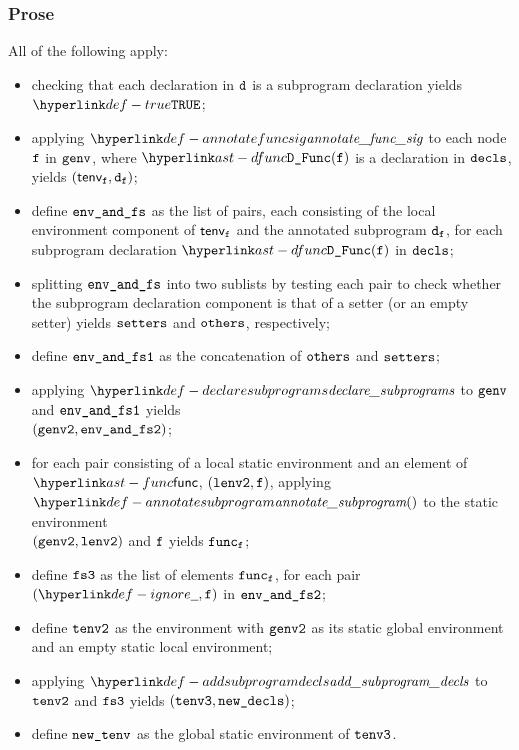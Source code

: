 \subsubsection{Prose}
All of the following apply:
\begin{itemize}
  \item checking that each declaration in $\texttt{d}$ is a subprogram declaration yields $\True$\ProseOrTypeError;
  \item applying $\annotatefuncsig$ to each node $\texttt{f}$ in $\texttt{genv}$, where $\DFunc(\vf)$ is a declaration in $\texttt{decls}$,
        yields $(\textsf{tenv}_{\texttt{f}}, \texttt{d}_{\texttt{f}})$\ProseOrTypeError;
  \item define $\texttt{env\_and\_fs}$ as the list of pairs, each consisting of the local environment component of $\textsf{tenv}_{\texttt{f}}$
        and the annotated subprogram $\texttt{d}_{\texttt{f}}$, for each subprogram declaration $\DFunc(\vf)$ in $\texttt{decls}$;
  \item splitting $\texttt{env\_and\_fs}$ into two sublists by testing each pair to check whether the subprogram declaration
        component is that of a setter (or an empty setter) yields $\texttt{setters}$ and $\texttt{others}$, respectively;
  \item define $\texttt{env\_and\_fs1}$ as the concatenation of $\texttt{others}$ and $\texttt{setters}$;
  \item applying $\declaresubprograms$ to $\texttt{genv}$ and $\texttt{env\_and\_fs1}$ yields \\
        $(\texttt{genv2}, \texttt{env\_and\_fs2})$\ProseOrTypeError;
  \item for each pair consisting of a local static environment and an element of $\func$, $(\texttt{lenv2}, \texttt{f})$,
        applying $\annotatesubprogram$ to the static environment \\
        $(\texttt{genv2}, \texttt{lenv2})$ and $\texttt{f}$ yields $\texttt{func}_{\texttt{f}}$\ProseOrTypeError;
  \item define $\texttt{fs3}$ as the list of elements $\texttt{func}_{\texttt{f}}$, for each pair $(\Ignore, \vf)$ in
        $\texttt{env\_and\_fs2}$;
  \item define $\texttt{tenv2}$ as the environment with $\texttt{genv2}$ as its static global environment
        and an empty static local environment;
  \item applying $\addsubprogramdecls$ to $\texttt{tenv2}$ and $\texttt{fs3}$ yields $(\texttt{tenv3}, \texttt{new\_decls})$;
  \item define $\texttt{new\_tenv}$ as the global static environment of $\texttt{tenv3}$.
\end{itemize}


